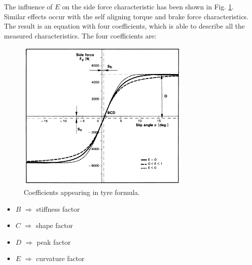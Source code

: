 \documentclass[12pt]{article}
\begin{document}
The influence of $E$ on the side force characteristic has been shown in Fig. \ref{fig_03:coefficients-appearing-in-tyre_formula}. Similar effects occur with the self aligning torque and brake force characteristics. The result is an equation with four coefficients, which is able to describe all the measured
characteristics. The four coefficients are:
\begin{figure}[t]
	\centering
	\includegraphics[width=0.75\textwidth,keepaspectratio]{images/Coefficients-Appearing-In-Tyre_Formula.pdf}
	\caption{Coefficients appearing in tyre formula.}
	\label{fig_03:coefficients-appearing-in-tyre_formula}
\end{figure}
\begin{itemize}
	\item $B$ $\Rightarrow$ stiffness factor
	\item $C$ $\Rightarrow$ shape factor
	\item $D$ $\Rightarrow$ peak factor
	\item $E$ $\Rightarrow$ curvature factor
\end{itemize}
\end{document}
